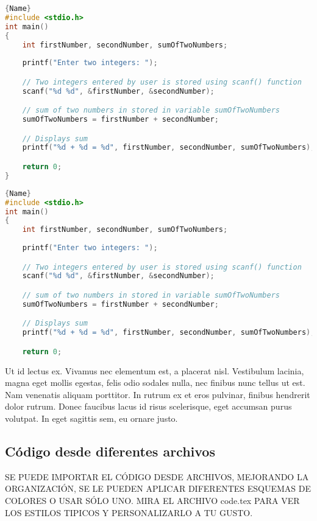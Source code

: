 \noindent\begin{minipage}{.45\textwidth}
	\begin{lstlisting}[caption=comparativa 1, style=colorBB, style=colorA-frameround,frame=tlrb, language=C]{Name}
#include <stdio.h>
int main()
{
    int firstNumber, secondNumber, sumOfTwoNumbers;
    
    printf("Enter two integers: ");

    // Two integers entered by user is stored using scanf() function
    scanf("%d %d", &firstNumber, &secondNumber);

    // sum of two numbers in stored in variable sumOfTwoNumbers
    sumOfTwoNumbers = firstNumber + secondNumber;

    // Displays sum      
    printf("%d + %d = %d", firstNumber, secondNumber, sumOfTwoNumbers);

    return 0;
}	\end{lstlisting}
\end{minipage}\hfill
\begin{minipage}{.45\textwidth}
	\begin{lstlisting}[caption=comparativa 2,style=colorBB, style=colorA-frameround, frame=tlrb , language=C]{Name}
#include <stdio.h>
int main()
{
    int firstNumber, secondNumber, sumOfTwoNumbers;
    
    printf("Enter two integers: ");

    // Two integers entered by user is stored using scanf() function
    scanf("%d %d", &firstNumber, &secondNumber);

    // sum of two numbers in stored in variable sumOfTwoNumbers
    sumOfTwoNumbers = firstNumber + secondNumber;

    // Displays sum      
    printf("%d + %d = %d", firstNumber, secondNumber, sumOfTwoNumbers);

    return 0;
	\end{lstlisting}
\end{minipage}


Ut id lectus ex. Vivamus nec elementum est, a placerat nisl. Vestibulum lacinia, magna eget mollis egestas, felis odio sodales nulla, nec finibus nunc tellus ut est. Nam venenatis aliquam porttitor. In rutrum ex et eros pulvinar, finibus hendrerit dolor rutrum. Donec faucibus lacus id risus scelerisque, eget accumsan purus volutpat. In eget sagittis sem, eu ornare justo.

\subsection{Código desde diferentes archivos}
SE PUEDE IMPORTAR EL CÓDIGO DESDE ARCHIVOS, MEJORANDO LA ORGANIZACIÓN, SE LE PUEDEN APLICAR DIFERENTES ESQUEMAS DE COLORES O USAR SÓLO UNO. MIRA EL ARCHIVO code.tex PARA VER LOS ESTILOS TIPICOS Y PERSONALIZARLO A TU GUSTO.

